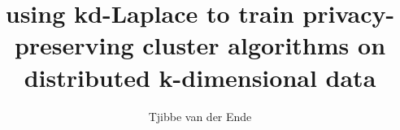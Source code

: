 \documentclass{ou-report}
\begin{document}
\pagestyle{plain}
\title{using kd-Laplace to train privacy-preserving cluster algorithms on distributed k-dimensional data}
\author{Tjibbe van der Ende}
%



\frontmatter
\renewcommand{\algorithmicrequire}{\textbf{Input:}}
\renewcommand{\algorithmicensure}{\textbf{Output:}}
\let\cleardoublepage\clearpage

%

%
\tableofcontents



%
%


\mainmatter
{}







\newpage

\newpage

\newpage


%

%

%

%

%



\backmatter
{}





%  
%  
%  
\clearpage
\printglossaries

\appendix



\end{document}
